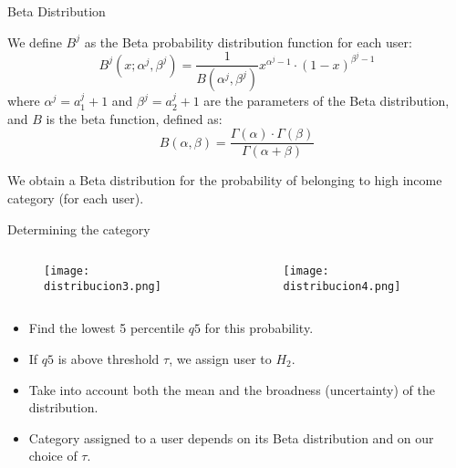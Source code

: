 \documentclass[usenames,dvipsnames]{beamer}
\newcommand{\Beta}{B}
\begin{document}
\begin{frame}{Beta Distribution}

We define \(\Beta^j\) as the Beta probability distribution function for each user:
\begin{equation}
	\Beta^j \left( x; \alpha^j, \beta^j \right) = \frac{1}{\Beta \left( \alpha^j, \beta^j \right)} x^{\alpha^j - 1} \cdot {\left( 1 - x \right)}^{\beta^j - 1}
\label{Beta}
\end{equation}
where $\alpha^j = a^j_1 +1$ and $\beta^j = a^j_2 +1$ are the parameters of the Beta distribution,
and $\Beta$ is the beta function, defined as:
\begin{equation}
\Beta \left( \alpha, \beta \right) =
\frac{\Gamma \! \left( \alpha \right) \cdot \Gamma \! \left( \beta \right)}
{\Gamma \! \left( \alpha + \beta \right)}
\label{Beta}
\end{equation}

We obtain a Beta distribution for the probability of belonging to high income category (for each user).

\end{frame}



\begin{frame}{Determining the category}

	\begin{columns}
		\begin{column}{0.49\textwidth}

\begin{figure}[h]
\begin{center}
\texttt{[image: distribucion3.png]}
\end{center}
\end{figure}
\end{column}

\begin{column}{0.49\textwidth}

\begin{figure}[h]
\begin{center}
\texttt{[image: distribucion4.png]}
\end{center}
\end{figure}

\end{column}
\end{columns}


\begin{itemize}

\item Find the lowest 5 percentile $q5$ for this probability. 

\item If $q5$ is above threshold $\tau$, we assign user to $H_2$.

\item Take into account both the mean and the broadness (uncertainty) of the distribution. 

\item Category assigned to a user depends on its Beta distribution and on our choice of $\tau$.
\end{itemize}

\end{frame}
\end{document}
